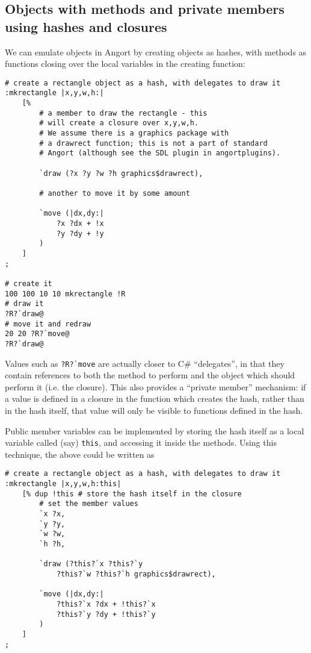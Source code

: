 \subsection{Objects with methods and private members using hashes and closures}
We can emulate objects in Angort by creating objects as
hashes, with methods as functions closing over the local variables
in the creating function:

\begin{lstlisting}
# create a rectangle object as a hash, with delegates to draw it
:mkrectangle |x,y,w,h:|
    [%
        # a member to draw the rectangle - this
        # will create a closure over x,y,w,h.
        # We assume there is a graphics package with
        # a drawrect function; this is not a part of standard
        # Angort (although see the SDL plugin in angortplugins).
        
        `draw (?x ?y ?w ?h graphics$drawrect),
        
        # another to move it by some amount
        
        `move (|dx,dy:| 
            ?x ?dx + !x
            ?y ?dy + !y
        )
    ]
;   

# create it
100 100 10 10 mkrectangle !R
# draw it
?R?`draw@
# move it and redraw
20 20 ?R?`move@
?R?`draw@
\end{lstlisting}
Values such as \verb+?R?`move+ are actually closer to C\# ``delegates'', in that they 
contain references to
both the method to perform and the object which should perform it
(i.e. the closure).
This also provides a ``private member'' mechanism: if a value is defined
in a closure in the function which creates the hash, rather than in
the hash itself, that value will only be visible to functions defined
in the hash.

Public member variables can be implemented by storing the hash
itself as a local variable called (say) \texttt{this}, and accessing it inside
the methods. Using this technique, the above could be written as 
\begin{lstlisting}
# create a rectangle object as a hash, with delegates to draw it
:mkrectangle |x,y,w,h:this|
    [% dup !this # store the hash itself in the closure
        # set the member values
        `x ?x,
        `y ?y,
        `w ?w,
        `h ?h,
        
        `draw (?this?`x ?this?`y 
            ?this?`w ?this?`h graphics$drawrect),
        
        `move (|dx,dy:| 
            ?this?`x ?dx + !this?`x
            ?this?`y ?dy + !this?`y
        )
    ]
;   
\end{lstlisting}


